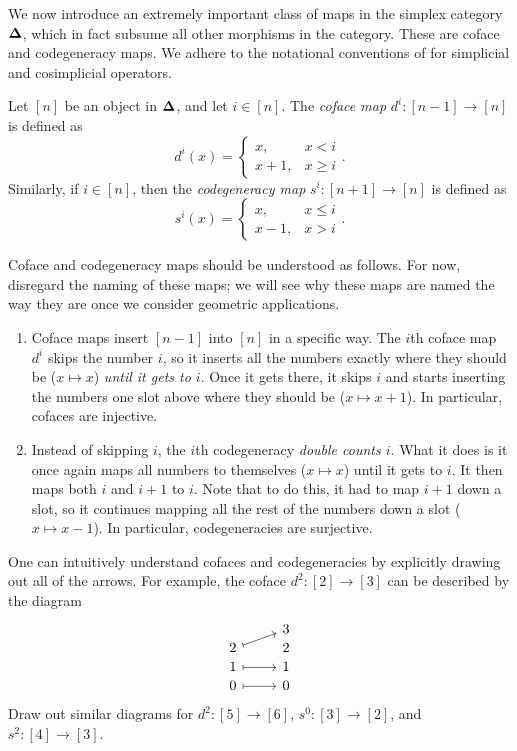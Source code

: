 We now introduce an extremely important class of maps in the simplex category $\boldsymbol{\Delta}$, which in fact subsume all other morphisms in the category. These are coface and codegeneracy maps. We adhere to the notational conventions of \cite{gj} for simplicial and cosimplicial operators.

\begin{definition}\label{2.3.1}
    Let $[n]$ be an object in $\boldsymbol{\Delta}$, and let $i\in[n]$. The \emph{coface map} $d^i : [n-1] \to [n]$ is defined as
    \[
    d^i(x)=\begin{cases}
        x,&x<i\\
        x+1,&x\geq i
    \end{cases}.
    \]
    Similarly, if $i\in[n]$, then the \emph{codegeneracy map} $s^i : [n+1]\to [n]$ is defined as
    \[
    s^i(x)=\begin{cases}
        x,&x\leq i\\
        x-1,&x>i
    \end{cases}.
    \]
\end{definition}

\begin{intuition}\label{2.3.2}
    Coface and codegeneracy maps should be understood as follows. For now, disregard the naming of these maps; we will see why these maps are named the way they are once we consider geometric applications.
    \begin{enumerate}
        \item Coface maps insert $[n-1]$ into $[n]$ in a specific way. The $i$th coface map $d^i$ skips the number $i$, so it inserts all the numbers exactly where they should be ($x\mapsto x$) \emph{until it gets to $i$}. Once it gets there, it skips $i$ and starts inserting the numbers one slot above where they should be ($x\mapsto x+1$). In particular, cofaces are injective.
        \item Instead of skipping $i$, the $i$th codegeneracy \emph{double counts $i$}. What it does is it once again maps all numbers to themselves ($x\mapsto x$) until it gets to $i$. It then maps both $i$ and $i+1$ to $i$. Note that to do this, it had to map $i+1$ down a slot, so it continues mapping all the rest of the numbers down a slot ($x\mapsto x-1$). In particular, codegeneracies are surjective.
    \end{enumerate}
\end{intuition}

\begin{exercise}\label{2.3.3}
    One can intuitively understand cofaces and codegeneracies by explicitly drawing out all of the arrows. For example, the coface $d^2 : [2]\to [3]$ can be described by the diagram
    \[
    \begin{tikzcd}[row sep=0em]
        & 3\\
        2 \ar[mapsto, ur] & 2\\
        1\ar[mapsto, r] & 1\\
        0\ar[mapsto, r] & 0
    \end{tikzcd}
    \]
    Draw out similar diagrams for $d^2 : [5] \to [6]$, $s^0 : [3] \to [2]$, and $s^2 : [4] \to [3]$.
\end{exercise}

